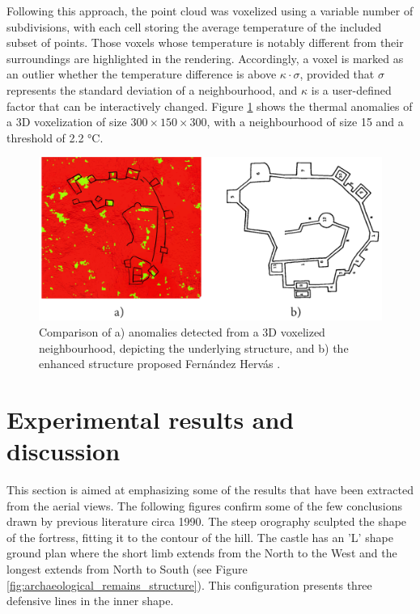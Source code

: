 \newpage
Following this approach, the point cloud was voxelized using a variable number of subdivisions, with each cell storing the average temperature of the included subset of points. Those voxels whose temperature is notably different from their surroundings are highlighted in the rendering. Accordingly, a voxel is marked as an outlier whether the temperature difference is above $\kappa \cdot \sigma$, provided that $\sigma$ represents the standard deviation of a neighbourhood, and $\kappa$ is a user-defined factor that can be interactively changed. Figure \ref{fig:voxel_anomalies} shows the thermal anomalies of a 3D voxelization of size $300 \times 150 \times 300$, with a neighbourhood of size 15 and a threshold of 2.2 \si{\celsius}.

\begin{figure}[ht]
    \centering
    \includegraphics[width=.98\linewidth]{figs/castle_puerta_arenas/voxel_anomalies_highlighted.png}
	\caption{Comparison of a) anomalies detected from a 3D voxelized neighbourhood, depicting the underlying structure, and b) the enhanced structure proposed Fernández Hervás \cite{fernandez_hervas_castillo_1986}.}
	\label{fig:voxel_anomalies}
\end{figure}


\section{Experimental results and discussion}

This section is aimed at emphasizing some of the results that have been extracted from the aerial views. The following figures confirm some of the few conclusions drawn by previous literature circa 1990. The steep orography sculpted the shape of the fortress, fitting it to the contour of the hill. The castle has an 'L' shape ground plan where the short limb extends from the North to the West and the longest extends from North to South (see Figure \ref{fig:archaeological_remains_structure}). This configuration presents three defensive lines in the inner shape. 

